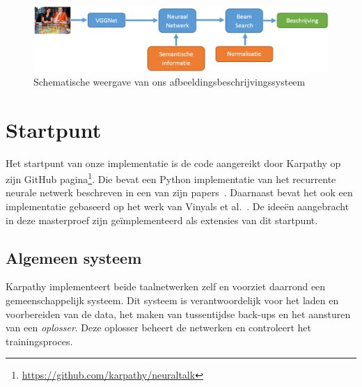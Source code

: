 \begin{figure}
\centering
\includegraphics[width=\linewidth]{Images/system_overview}
\caption{Schematische weergave van ons afbeeldingsbeschrijvingssysteem}
\label{fig:system_overview}
\end{figure}



\section{Startpunt}
Het startpunt van onze implementatie is de code aangereikt door Karpathy op zijn GitHub pagina\footnote{\url{https://github.com/karpathy/neuraltalk}}. Die bevat een Python implementatie van het recurrente neurale netwerk beschreven in een van zijn papers~\cite{Karpathy2015}. Daarnaast bevat het ook een implementatie gebaseerd op het werk van Vinyals et al.~\cite{Google}. De idee\"en aangebracht in deze masterproef zijn ge\"implementeerd als extensies van dit startpunt.

\subsection{Algemeen systeem}
Karpathy implementeert beide taalnetwerken zelf en voorziet daarrond een gemeenschappelijk systeem. Dit systeem is verantwoordelijk voor het laden en voorbereiden van de data, het maken van tussentijdse back-ups en het aansturen van een \emph{oplosser}. Deze oplosser beheert de netwerken en controleert het trainingsproces.

